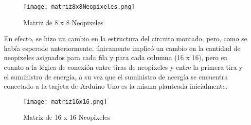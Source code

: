 \documentclass{article}
\begin{document}
\begin{figure} 
    \centering
    \texttt{[image: matriz8x8Neopixeles.png]}
    \caption{Matriz de 8 x 8 Neopixeles}
    \label{fig:mat8x8_neo}
\end{figure}
En efecto, se hizo un cambio en la estructura del circuito montado, pero, como se había esperado anteriormente, únicamente implicó un cambio en la cantidad de neopixeles asignados para cada fila y para cada columna (16 x 16), pero en cuanto a la lógica de conexión entre tiras de neopixeles y entre la primera tira y el suministro de energía, a su vez que el suministro de neergía se encuentra conectado a la tarjeta de Arduino Uno es la misma planteada inicialmente.
\begin{figure} 
    \centering
    \texttt{[image: matriz16x16.png]}
    \caption{Matriz de 16 x 16 Neopixeles}
    \label{fig:mat16x16_neo}
\end{figure}
\end{document}
